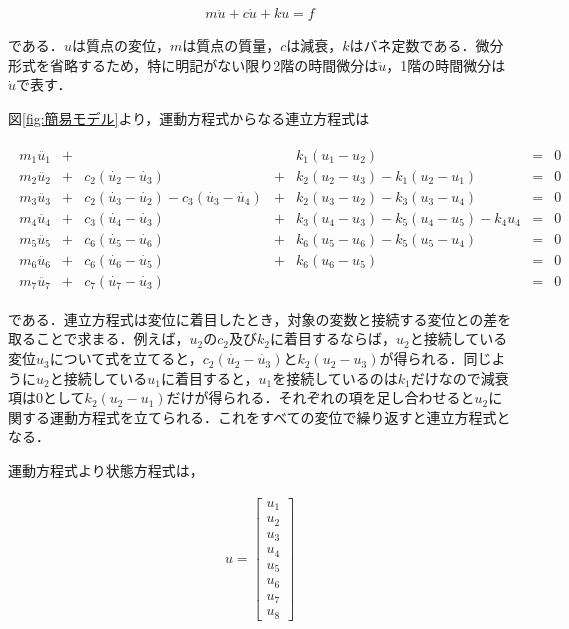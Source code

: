 \begin{eqnarray}
    m\ddot{u} + c\dot{u} + ku = f
\end{eqnarray}

である．$u$は質点の変位，$m$は質点の質量，$c$は減衰，$k$はバネ定数である．微分形式を省略するため，特に明記がない限り2階の時間微分は$\ddot{u}$，1階の時間微分は$\dot{u}$で表す．

図\ref{fig:簡易モデル}より，運動方程式からなる連立方程式は

\begin{eqnarray}
    \begin{matrix}
        m_1 \ddot{u_1} &+&  & & k_1 (u_1 - u_2) &=& 0 \\ 
        m_2 \ddot{u_2} &+& c_2(\dot{u_2} - \dot{u_3}) &+& k_2 (u_2 - u_3) - k_1 (u_2 - u_1) &=& 0 \\ 
        m_3 \ddot{u_3} &+& c_2(\dot{u_3} - \dot{u_2}) - c_3(\dot{u_3} - \dot{u_4}) &+& k_2 (u_3 - u_2) - k_3 (u_3 - u_4) &=& 0 \\ 
        m_4 \ddot{u_4} &+& c_3(\dot{u_4} - \dot{u_3}) &+& k_3 (u_4 - u_3) - k_5 (u_4 - u_5) - k_4 u_4 &=& 0 \\ 
        m_5 \ddot{u_5} &+& c_6(\dot{u_5} - \dot{u_6}) &+& k_6 (u_5 - u_6) - k_5 (u_5 - u_4) &=& 0 \\
        m_6 \ddot{u_6} &+& c_6(\dot{u_6} - \dot{u_5}) &+& k_6 (u_6 - u_5) &=& 0 \\
        m_7 \ddot{u_7} &+& c_7(\dot{u_7} - \dot{u_3}) & & &=& 0
    \end{matrix}        
\end{eqnarray}

である．連立方程式は変位に着目したとき，対象の変数と接続する変位との差を取ることで求まる．例えば，$u_2$の$c_2$及び$k_2$に着目するならば，$u_2$と接続している変位$u_3$について式を立てると，$c_2(\dot{u_2} - \dot{u_3})$と$k_2(u_2 - u_3)$が得られる．同じように$u_2$と接続している$u_1$に着目すると，$u_1$を接続しているのは$k_1$だけなので減衰項は$0$として$k_2(u_2 - u_1)$だけが得られる．それぞれの項を足し合わせると$u_2$に関する運動方程式を立てられる．これをすべての変位で繰り返すと連立方程式となる．

運動方程式より状態方程式は，

\begin{eqnarray}
    u = 
    \left[\begin{matrix}
        u_1 \\
        u_2 \\
        u_3 \\
        u_4 \\
        u_5 \\
        u_6 \\
        u_7 \\
        u_8
    \end{matrix}\right]
\end{eqnarray}

